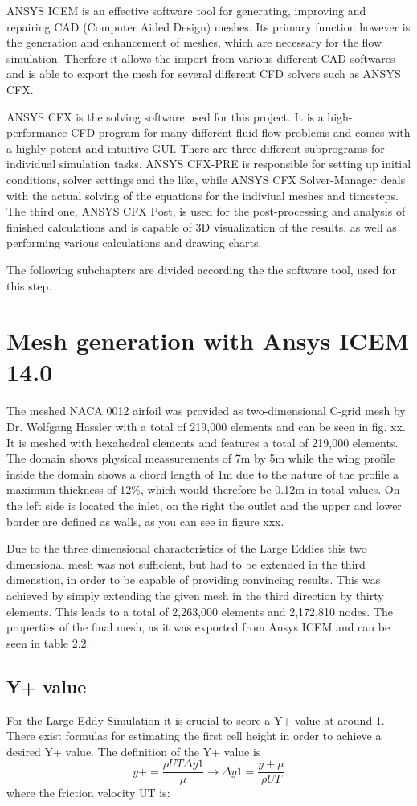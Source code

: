 ANSYS ICEM is an effective software tool for generating, improving and repairing CAD (Computer Aided Design) meshes. Its primary function however is the generation and enhancement of meshes, which are necessary for the flow simulation. Therfore it allows the import from various different CAD softwares and is able to export the mesh for several different CFD solvers such as ANSYS CFX.
	
ANSYS CFX is the solving software used for this project. It is a high-performance CFD program for many different fluid flow problems and comes with a highly potent and intuitive GUI. There are three different subprograms for individual simulation tasks. ANSYS CFX-PRE is responsible for setting up initial conditions, solver settings and the like, while ANSYS CFX Solver-Manager deals with the actual solving of the equations for the indiviual meshes and timesteps. The third one, ANSYS CFX Post, is used for the post-processing and analysis of finished calculations and is capable of 3D visualization of the results, as well as performing various calculations and drawing charts.

The following subchapters are divided according the the software tool, used for this step.
\section{Mesh generation with Ansys ICEM 14.0}
The meshed NACA 0012 airfoil was provided as two-dimensional C-grid mesh by Dr. Wolfgang Hassler with a total of 219,000 elements and can be seen in fig. xx. It is meshed with hexahedral elements and features a total of 219,000 elements. The domain shows physical meassurements of 7m by 5m while the wing profile inside the domain shows a chord length of 1m due to the nature of the profile a maximum thickness of 12\%, which would therefore be 0.12m in total values. On the left side is located the inlet, on the right the outlet and the upper and lower border are defined as walls, as you can see in figure xxx.

Due to the three dimensional characteristics of the Large Eddies this two dimensional mesh was not sufficient, but had to be extended in the third dimenstion, in order to be capable of providing convincing results. This was achieved by simply extending the given mesh in the third direction by thirty elements. This leads to a total of 2,263,000 elements and 2,172,810 nodes. The properties of the final mesh, as it was exported from Ansys ICEM and can be seen in table 2.2.
\subsection{Y+ value}
For the Large Eddy Simulation it is crucial to score a Y+ value at around 1. There exist formulas for estimating the first cell height in order to achieve a desired Y+ value.
The definition of the Y+ value is
\begin{equation}
y+ =  \frac{\rho UT \Delta y1}{\mu}  \rightarrow \Delta y1 = \frac{y+ \mu}{\rho UT}
\end{equation}  
where the friction velocity UT is:

